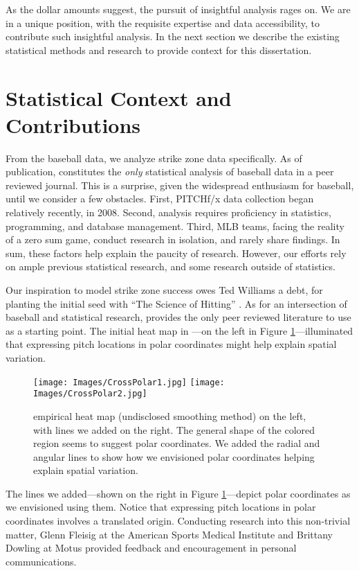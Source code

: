 As the dollar amounts suggest, the pursuit of insightful analysis rages on. We are in a unique position, with the requisite expertise and data accessibility, to contribute such insightful analysis. In the next section we describe the existing statistical methods and research to provide context for this dissertation.

\section{Statistical Context and Contributions}


From the baseball data, we analyze strike zone data specifically. As of publication, \cite{Cross2015} constitutes the {\it only} statistical analysis of baseball data in a peer reviewed journal. This is a surprise, given the widespread enthusiasm for baseball, until we consider a few obstacles. First, PITCHf/x\textsuperscript{\textregistered} data collection began relatively recently, in 2008. Second, analysis requires proficiency in statistics, programming, and database management. Third, MLB teams, facing the reality of a zero sum game, conduct research in isolation, and rarely share findings. In sum, these factors help explain the paucity of research. However, our efforts rely on ample previous statistical research, and some research outside of statistics.

Our inspiration to model strike zone success owes Ted Williams a debt, for planting the initial seed with ``The Science of Hitting'' \citep{Williams1971}. As for an intersection of baseball and statistical research, \cite{Cross2015} provides the only peer reviewed literature to use as a starting point. The initial heat map in \cite{Cross2015}---on the left in Figure \ref{fig:cross}---illuminated that expressing pitch locations in polar coordinates might help explain spatial variation. 
        \begin{figure}[H]
      	\centering
      	\texttt{[image: Images/CrossPolar1.jpg]} 
      	\texttt{[image: Images/CrossPolar2.jpg]} 
      	\caption{\cite{Cross2015} empirical heat map (undisclosed smoothing method) on the left, with lines we added on the right. The general shape of the colored region seems to suggest polar coordinates. We added the radial and angular lines to show how we envisioned polar coordinates helping explain spatial variation.}
      	\label{fig:cross}
      	\end{figure}
The lines we added---shown on the right in Figure \ref{fig:cross}---depict polar coordinates as we envisioned using them. Notice that expressing pitch locations in polar coordinates involves a translated origin. Conducting research into this non-trivial matter, Glenn Fleisig at the American Sports Medical Institute \citep{Fleisig2002} and Brittany Dowling at Motus \citep{Dowling2016} provided feedback and encouragement in personal communications. 

